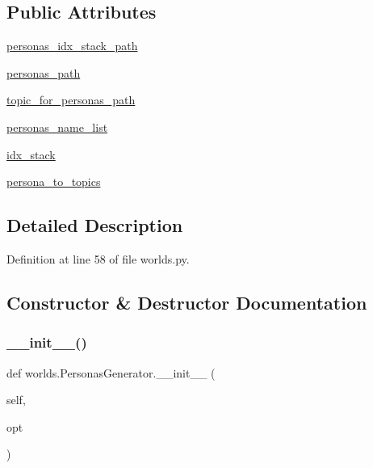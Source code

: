 \subsection*{Public Attributes}
\begin{DoxyCompactItemize}
\item 
\hyperlink{classworlds_1_1PersonasGenerator_a2e324c3d90bad7cd4d69aece753bcf1a}{personas\+\_\+idx\+\_\+stack\+\_\+path}
\item 
\hyperlink{classworlds_1_1PersonasGenerator_a82f51036a667eb5c77cc7d828a5b675c}{personas\+\_\+path}
\item 
\hyperlink{classworlds_1_1PersonasGenerator_a77dabd286472df0e43ac43d2f82594a0}{topic\+\_\+for\+\_\+personas\+\_\+path}
\item 
\hyperlink{classworlds_1_1PersonasGenerator_a5ef45f2b69f83722eecf66e27bd27b21}{personas\+\_\+name\+\_\+list}
\item 
\hyperlink{classworlds_1_1PersonasGenerator_aca7d1eab201b4561c0162d0992803d6b}{idx\+\_\+stack}
\item 
\hyperlink{classworlds_1_1PersonasGenerator_affd5c6a265862a72c456570297f77466}{persona\+\_\+to\+\_\+topics}
\end{DoxyCompactItemize}


\subsection{Detailed Description}


Definition at line 58 of file worlds.\+py.



\subsection{Constructor \& Destructor Documentation}
\mbox{\label{classworlds_1_1PersonasGenerator_a8de0721e02fce900b4f3c15f6cf0e2e1}} 
\subsubsection{\texorpdfstring{\+\_\+\+\_\+init\+\_\+\+\_\+()}{\_\_init\_\_()}\hspace{0.1cm}{\footnotesize\ttfamily [1/2]}}
{\footnotesize\ttfamily def worlds.\+Personas\+Generator.\+\_\+\+\_\+init\+\_\+\+\_\+ (\begin{DoxyParamCaption}\item[{}]{self,  }\item[{}]{opt }\end{DoxyParamCaption})}



